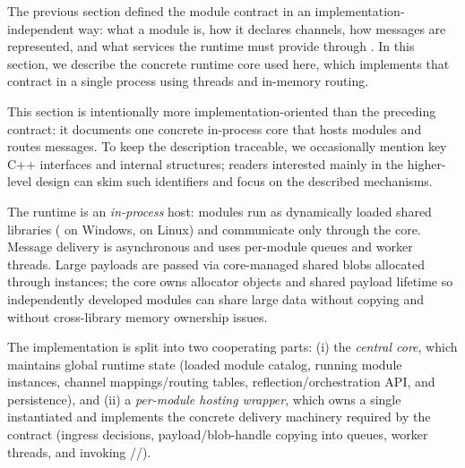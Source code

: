 The previous section defined the module contract in an implementation-independent way: what a module is, how it declares channels, how messages are represented, and what services the runtime must provide through . In this section, we describe the concrete runtime core used here, which implements that contract in a single process using threads and in-memory routing.

This section is intentionally more implementation-oriented than the preceding contract: it documents one concrete in-process core that hosts modules and routes messages.
To keep the description traceable, we occasionally mention key C++ interfaces and internal structures; readers interested mainly in the higher-level design can skim such identifiers and focus on the described mechanisms.

The runtime is an \emph{in-process} host: modules run as dynamically loaded shared libraries ( on Windows,  on Linux) and communicate only through the core.
Message delivery is asynchronous and uses per-module queues and worker threads.
Large payloads are passed via core-managed shared blobs allocated through  instances; the core owns allocator objects and shared payload lifetime so independently developed modules can share large data without copying and without cross-library memory ownership issues.

The implementation is split into two cooperating parts:
(i) the \emph{central core}, which maintains global runtime state (loaded module catalog, running module instances, channel mappings/routing tables, reflection/orchestration API, and persistence), and
(ii) a \emph{per-module hosting wrapper}, which owns a single instantiated  and implements the concrete delivery machinery required by the contract (ingress decisions, payload/blob-handle copying into queues, worker threads, and invoking //).


